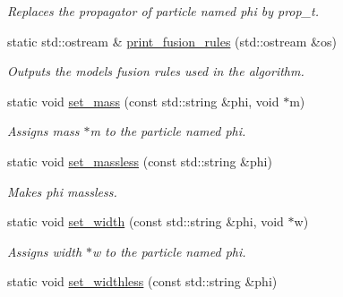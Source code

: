 \begin{DoxyCompactItemize}
\begin{DoxyCompactList}\small\item\em Replaces the propagator of particle named \textquotesingle{}phi\textquotesingle{} by prop\+\_\+t. \end{DoxyCompactList}\item 
\hypertarget{a00372_acb0ac734ee049874616f1660013d9c52}{}static std\+::ostream \& \hyperlink{a00372_acb0ac734ee049874616f1660013d9c52}{print\+\_\+fusion\+\_\+rules} (std\+::ostream \&os)\label{a00372_acb0ac734ee049874616f1660013d9c52}

\begin{DoxyCompactList}\small\item\em Outputs the model\textquotesingle{}s fusion rules used in the algorithm. \end{DoxyCompactList}\item 
\hypertarget{a00372_acbaaea84018bd272a5e50ff5a8a16d59}{}static void \hyperlink{a00372_acbaaea84018bd272a5e50ff5a8a16d59}{set\+\_\+mass} (const std\+::string \&phi, void $\ast$m)\label{a00372_acbaaea84018bd272a5e50ff5a8a16d59}

\begin{DoxyCompactList}\small\item\em Assigns mass $\ast$m to the particle named phi. \end{DoxyCompactList}\item 
\hypertarget{a00372_a75ccd0d0b23effc40e91ce86b480442a}{}static void \hyperlink{a00372_a75ccd0d0b23effc40e91ce86b480442a}{set\+\_\+massless} (const std\+::string \&phi)\label{a00372_a75ccd0d0b23effc40e91ce86b480442a}

\begin{DoxyCompactList}\small\item\em Makes phi massless. \end{DoxyCompactList}\item 
\hypertarget{a00372_ae79c4efd782a898b3e5248968f5d6238}{}static void \hyperlink{a00372_ae79c4efd782a898b3e5248968f5d6238}{set\+\_\+width} (const std\+::string \&phi, void $\ast$w)\label{a00372_ae79c4efd782a898b3e5248968f5d6238}

\begin{DoxyCompactList}\small\item\em Assigns width $\ast$w to the particle named phi. \end{DoxyCompactList}\item 
\hypertarget{a00372_a5af701e8e6e12a44184ea6e7b699c6d0}{}static void \hyperlink{a00372_a5af701e8e6e12a44184ea6e7b699c6d0}{set\+\_\+widthless} (const std\+::string \&phi)\label{a00372_a5af701e8e6e12a44184ea6e7b699c6d0}


\end{DoxyCompactItemize}
